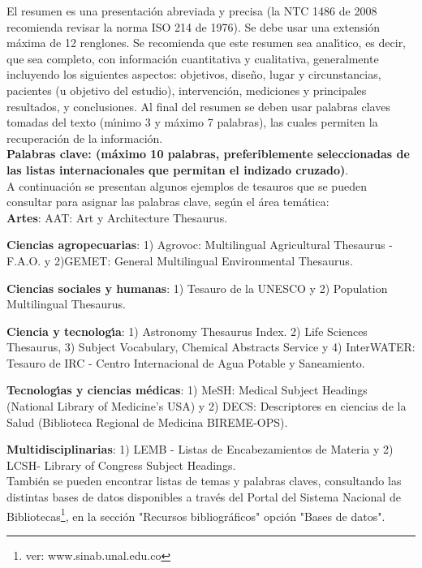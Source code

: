 El resumen es una presentaci\'{o}n abreviada y precisa (la NTC 1486 de 2008 recomienda revisar la norma ISO 214 de 1976). Se debe usar una extensi\'{o}n m\'{a}xima de 12 renglones. Se recomienda que este resumen sea anal\'{\i}tico, es decir, que sea completo, con informaci\'{o}n cuantitativa y cualitativa, generalmente incluyendo los siguientes aspectos: objetivos, dise\~{n}o, lugar y circunstancias, pacientes (u objetivo del estudio), intervenci\'{o}n, mediciones y principales resultados, y conclusiones. Al final del resumen se deben usar palabras claves tomadas del texto (m\'{\i}nimo 3 y m\'{a}ximo 7 palabras), las cuales permiten la recuperaci\'{o}n de la informaci\'{o}n.\\

\textbf{\small Palabras clave: (m\'{a}ximo 10 palabras, preferiblemente seleccionadas de las listas internacionales que permitan el indizado cruzado)}.\\

A continuaci\'{o}n se presentan algunos ejemplos de tesauros que se pueden consultar para asignar las palabras clave, seg\'{u}n el \'{a}rea tem\'{a}tica:\\

\textbf{Artes}: AAT: Art y Architecture Thesaurus.

\textbf{Ciencias agropecuarias}: 1) Agrovoc: Multilingual Agricultural Thesaurus - F.A.O. y 2)GEMET: General Multilingual Environmental Thesaurus.

\textbf{Ciencias sociales y humanas}: 1) Tesauro de la UNESCO y 2) Population Multilingual Thesaurus.

\textbf{Ciencia y tecnolog\'{\i}a}: 1) Astronomy Thesaurus Index. 2) Life Sciences Thesaurus, 3) Subject Vocabulary, Chemical Abstracts Service y 4) InterWATER: Tesauro de IRC - Centro Internacional de Agua Potable y Saneamiento.

\textbf{Tecnolog\'{\i}as y ciencias m\'{e}dicas}: 1) MeSH: Medical Subject Headings (National Library of Medicine's USA) y 2) DECS: Descriptores en ciencias de la Salud (Biblioteca Regional de Medicina BIREME-OPS).

\textbf{Multidisciplinarias}: 1) LEMB - Listas de Encabezamientos de Materia y 2) LCSH- Library of Congress Subject Headings.\\

Tambi\'{e}n se pueden encontrar listas de temas y palabras claves, consultando las distintas bases de datos disponibles a trav\'{e}s del Portal del Sistema Nacional de Bibliotecas\footnote{ver: www.sinab.unal.edu.co}, en la secci\'{o}n "Recursos bibliogr\'{a}ficos" opci\'{o}n "Bases de datos".\\

